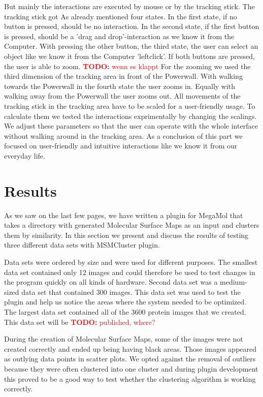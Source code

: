 \documentclass[journal]{vgtc}       %
\newcommand{\todo}[1]{\textcolor{red}{\textbf{TODO:} #1}}
\begin{document}
But mainly the interactions are executed by mouse or by the tracking stick. The tracking stick got As already mentioned four states. In the first state, if no button is pressed, should be no interaction. In the second state, if the first button is pressed, should be a 'drag and drop'-interaction as we know it from the Computer. With pressing the other button, the third state, the user can select an object like we know it from the Computer 'leftclick'. If both buttons are pressed, the user is able to zoom. \todo{wenn es klappt} For the zooming we used the third dimension of the tracking area in front of the Powerwall. With walking towards the Powerwall in the fourth state the user zooms in. Equally with walking away from the Powerwall the user zooms out. 
All movements of the tracking stick in the tracking area have to be scaled for a user-friendly usage. To calculate them we tested the interactions exprimentally by changing the scalings. We adjust these parameters so that the user can operate with the whole interface without walking around in the tracking area.
As a conclusion of this part we focused on user-friendly and intuitive interactions like we know it from our everyday life.



\section{Results}
As we saw on the last few pages, we have written a plugin for MegaMol that takes a directory with generated Molecular Surface Maps as an input and clusters  them by similarity. In this section we present and discuss the results of testing three different data sets with MSMCluster plugin. 

Data sets were ordered by size and were used for different purposes. The smallest data set contained only 12 images and could therefore be used to test changes in the program quickly on all kinds of hardware. Second data set was a medium-sized data set that contained 300 images. This data set was used to test the plugin and help us notice the areas where the system needed to be optimized. The largest data set contained all of the 3600 protein images that we created. This data set will be \todo{published, where?}

During the creation of Molecular Surface Maps, some of the images were not created correctly and ended up being having black areas. Those images appeared as outlying data points in scatter plots. We opted against the removal of outliers because they were often clustered into one cluster and during plugin development this proved to be a good way to test whether the clustering algorithm is working correctly.
\end{document}

